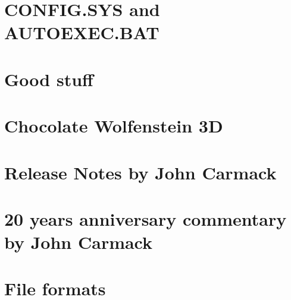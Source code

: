 \documentclass[8pt]{book}
\begin{document}
    \chapter{CONFIG.SYS and AUTOEXEC.BAT}
         
    \chapter{Good stuff}
          
    \chapter{Chocolate Wolfenstein 3D}
    \chapter{Release Notes by John Carmack}
        
    \chapter{20 years anniversary commentary by John Carmack}
        
    
    \chapter{File formats}
    
        
            
    
                    
        
                            
    
\end{document}
